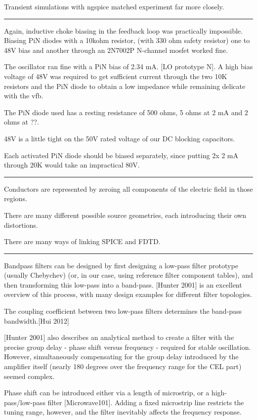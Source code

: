 \documentclass[paper.tex]{subfiles}
\begin{document}
Transient simulations with ngspice matched experiment far more closely.

\rule{\linewidth}{0.2pt}

Again, inductive choke biasing in the feedback loop was practically impossible. Biasing PiN diodes with a 10kohm resistor, (with 330 ohm safety resistor) one to 48V bias and another through an 2N7002P N-channel mosfet worked fine. 

The oscillator ran fine with a PiN bias of 2.34 mA. [LO prototype N]. A high bias voltage of 48V was required to get sufficient current through the two 10K resistors and the PiN diode to obtain a low impedance while remaining delicate with the vfb.

The PiN diode used has a resting resistance of 500 ohms, 5 ohms at 2 mA and 2 ohms at ??. 

48V is a little tight on the 50V rated voltage of our DC blocking capacitors.

Each activated PiN diode should be biased separately, since putting 2x 2 mA through 20K would take an impractical 80V.

\rule{\linewidth}{0.2pt}

Conductors are represented by zeroing all components of the electric field in those regions. 

There are many different possible source geometries, each introducing their own distortions.

There are many ways of linking SPICE and FDTD. 

\rule{\linewidth}{0.2pt}

Bandpass filters can be designed by first designing a low-pass filter prototype (usually Chebychev) (or, in our case, using reference filter component tables), and then transforming this low-pass into a band-pass. [Hunter 2001] is an excellent overview of this process, with many design examples for different filter topologies. 

The coupling coefficient between two low-pass filters determines the band-pass bandwidth.[Hui 2012]

[Hunter 2001] also describes an analytical method to create a filter with the precise group delay - phase shift versus frequency - required for stable oscillation. However, simultaneously compensating for the group delay introduced by the amplifier itself (nearly 180 degrees over the frequency range for the CEL part) seemed complex.

Phase shift can be introduced either via a length of microstrip, or a high-pass/low-pass filter [Microwave101]. Adding a fixed microstrip line restricts the tuning range, however, and the filter inevitably affects the frequency response.  
\end{document}
